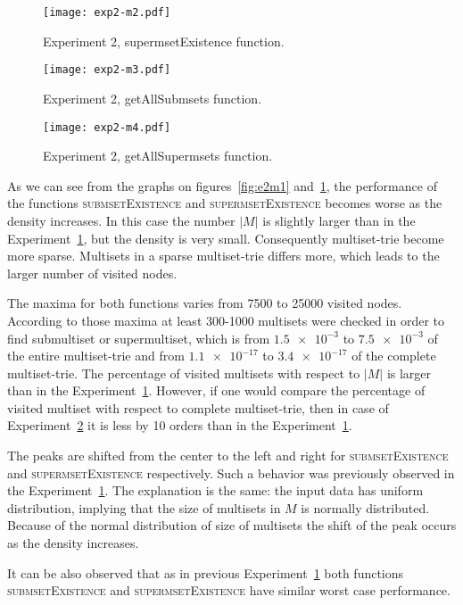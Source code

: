 \begin{figure}
\center
\texttt{[image: exp2-m2.pdf]}
\caption{Experiment 2, supermsetExistence function.}
\label{fig:e2m2}
\end{figure}

\begin{figure}
\center
\texttt{[image: exp2-m3.pdf]}
\caption{Experiment 2, getAllSubmsets function.}
\label{fig:e2m3}
\end{figure}

\begin{figure}
\center
\texttt{[image: exp2-m4.pdf]}
\caption{Experiment 2, getAllSupermsets function.}
\label{fig:e2m4}
\end{figure}

As we can see from the graphs on figures~\ref{fig:e2m1} and~\ref{fig:e2m2}, 
the performance of the functions \textsc{submsetExistence} and 
\textsc{supermsetExistence} becomes worse as the density increases. 
In this case the number $|M|$ is slightly larger than in the 
Experiment~\hyperref[s:exp1]{1}, but the density is very small. Consequently 
multiset-trie become more sparse. Multisets in a sparse multiset-trie differs more, 
which leads to the larger number of visited nodes. 

The maxima for both functions varies from 7500 to 25000 visited nodes. According 
to those maxima at least 300-1000 multisets were checked in order to find 
submultiset or supermultiset, which is from $\num{1.5e-3}$ to $\num{7.5e-3}$ of the entire 
multiset-trie and from $\num{1.1e-17}$ to $\num{3.4e-17}$ of the complete 
multiset-trie. The percentage of visited multisets with respect to $|M|$ is 
larger than in the Experiment~\hyperref[s:exp1]{1}. However, if one would compare 
the percentage of visited multiset with respect to complete multiset-trie, then 
in case of Experiment~\hyperref[s:exp2]{2} it is less by 10 orders than in the 
Experiment~\hyperref[s:exp1]{1}.

The peaks are shifted from the center to the left and right for 
\textsc{submsetExistence} and \textsc{supermsetExistence} respectively. Such a 
behavior was previously observed in the Experiment~\hyperref[s:exp1]{1}. The 
explanation is the same: the input data has uniform distribution, implying that 
the size of multisets in $M$ is normally distributed. Because of the normal 
distribution of size of multisets the shift of the peak occurs as the density increases.

It can be also observed that as in previous Experiment~\hyperref[s:exp1]{1} both 
functions \textsc{submsetExistence} and \textsc{supermsetExistence} have similar 
worst case performance. 


